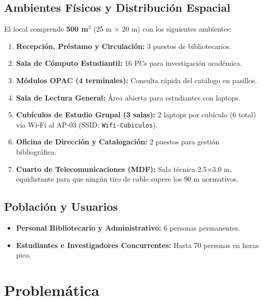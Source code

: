 \documentclass[12pt,a4paper]{article}
\begin{document}
\subsection{Ambientes Físicos y Distribución Espacial}

El local comprende \textbf{500 m$^2$} (25 m $\times$ 20 m) con los siguientes ambientes:

\begin{enumerate}[leftmargin=1.8em,itemsep=3pt]
  \item \textbf{Recepción, Préstamo y Circulación:} 3 puestos de bibliotecarios.
  \item \textbf{Sala de Cómputo Estudiantil:} 16 PCs para investigación académica.
  \item \textbf{Módulos OPAC (4 terminales):} Consulta rápida del catálogo en pasillos.
  \item \textbf{Sala de Lectura General:} Área abierta para estudiantes con laptops.
  \item \textbf{Cubículos de Estudio Grupal (3 salas):} 2 laptops por cubículo (6 total) vía Wi-Fi al AP-03 (SSID: \texttt{Wifi-Cubiculos}).
  \item \textbf{Oficina de Dirección y Catalogación:} 2 puestos para gestión bibliográfica.
  \item \textbf{Cuarto de Telecomunicaciones (MDF):} Sala técnica 2.5$\times$3.0 m, equidistante para que ningún tiro de cable supere los 90 m normativos.
\end{enumerate}

\subsection{Población y Usuarios}

\begin{itemize}[leftmargin=1.5em,itemsep=2pt]
  \item \textbf{Personal Bibliotecario y Administrativo:} 6 personas permanentes.
  \item \textbf{Estudiantes e Investigadores Concurrentes:} Hasta 70 personas en horas pico.
\end{itemize}

\section{Problemática}
\end{document}
